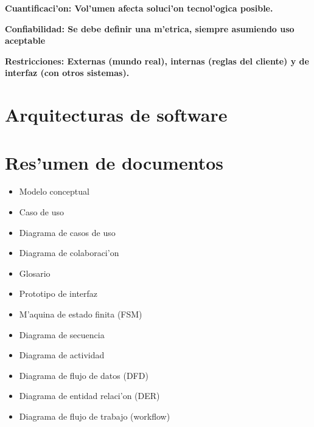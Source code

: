 \documentclass[a4paper,spanish]{article}
\newcommand{\defi}[2]{\bfseries #1: \mdseries #2}
\begin{document}
\defi{Cuantificaci'on}{Vol'umen afecta soluci'on tecnol'ogica posible.}

\defi{Confiabilidad}{Se debe definir una m'etrica, siempre asumiendo uso aceptable}

\defi{Restricciones}{Externas (mundo real), internas (reglas del cliente) y de interfaz (con otros sistemas).}


\section{Arquitecturas de software}





\section{Res'umen de documentos}

\begin{multicols}{2}
\begin{itemize}
\item Modelo conceptual
\item Caso de uso
\item Diagrama de casos de uso
\item Diagrama de colaboraci'on
\item Glosario
\item Prototipo de interfaz
\item M'aquina de estado finita (FSM)
\item Diagrama de secuencia
\item Diagrama de actividad
\item Diagrama de flujo de datos (DFD)
\item Diagrama de entidad relaci'on (DER)
\item Diagrama de flujo de trabajo (workflow)
\end{itemize}
\end{multicols}

\label{theend}
\end{document}
